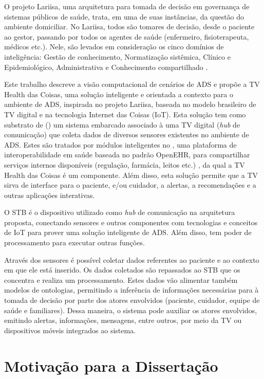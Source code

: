 O projeto Lariisa, uma arquitetura para tomada de decisão em governança
de sistemas públicos de saúde, trata, em uma de suas instâncias, da questão do
ambiente domiciliar. No Lariisa, todos são tomares de decisão, desde o paciente
ao gestor, passando por todos os agentes de saúde (enfermeiro, fisioterapeuta,
médicos etc.). Nele, são levados em consideração os cinco domínios de inteligência:
Gestão de conhecimento, Normatização sistêmica, Clínico e Epidemiológico,
Administrativa e Conhecimento compartilhado \cite{oliveira2010context}.

Este trabalho descreve a visão computacional de cenários de ADS e propõe a TV
Health das Coisas, uma solução inteligente e orientada a contexto para o
ambiente de ADS, inspirada no projeto Lariisa, baseada no modelo brasileiro de
TV digital e na tecnologia Internet das Coisas (IoT). Esta solução tem como
substrato de \hardware[] (\stb) um sistema embarcado associado à uma TV digital
(\textit{hub} de comunicação) que coleta dados de diversos sensores existentes
no ambiente de ADS. Estes são tratados por módulos inteligentes no
\nextsaude[], uma plataforma de interoperabilidade em saúde baseada no padrão
OpenEHR, para compartilhar serviços internos disponíveis (regulação, farmácia,
leitos etc.) \cite{mota2016}, da qual a TV Health das Coisas é um componente.
Além disso, esta solução permite que a TV sirva de interface para o paciente,
e/ou cuidador, a alertas, a recomendações e a outras aplicações interativas.

O STB é o dispositivo utilizado como \textit{hub} de comunicação na arquitetura
proposta, conectando sensores e outros componentes com tecnologias e conceitos
de IoT para  prover uma solução inteligente de ADS. Além
disso, tem poder de processamento para executar outras funções.

Através dos sensores é possível coletar dados referentes ao paciente e ao
contexto em que ele está inserido. Os dados coletados são repassados ao STB que
os concentra e realiza um processamento. Estes dados vão alimentar também
modelos de ontologias, permitindo a inferência de informações necessárias para
à tomada de decisão por parte dos atores  envolvidos (paciente, cuidador,
equipe de saúde e familiares). Dessa maneira, o sistema pode auxiliar os atores
envolvidos, emitindo alertas, informações, mensagens, entre outros, por meio da
TV ou dispositivos móveis integrados ao sistema. 

\section{Motivação para a Dissertação}\label{sec:motivacao}

